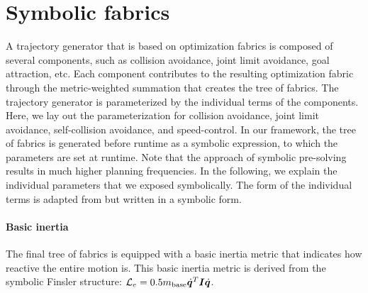 \section{Symbolic fabrics}
\label{sec:symbolic_fabrics}
%
A trajectory generator that is based on optimization fabrics is composed of several components, such as collision
avoidance, joint limit avoidance, goal attraction, etc. Each component contributes
to the resulting optimization fabric through the metric-weighted summation that creates the tree of fabrics.
The trajectory generator is parameterized by the individual terms of the components.
Here, we lay out the parameterization for collision
avoidance, joint limit avoidance, self-collision avoidance, and speed-control.
In our framework, the tree of
fabrics is generated before runtime as a symbolic expression, to which the parameters are set at runtime.
Note that the approach of symbolic pre-solving results in much higher planning frequencies.
In the following, we explain the individual parameters that we exposed symbolically. The form of the 
individual terms is adapted from \cite{Ratliff2020,Xie2021,Wyk2022} but written in a symbolic form.

\paragraph{Basic inertia}
The final tree of fabrics is equipped with a basic inertia metric that indicates how reactive the entire 
motion is. This basic inertia metric is derived from the symbolic Finsler structure:
$\mathcal{L}_e = 0.5m_{\textrm{base}}\dot{\bm{q}}^{T}\bm{I}\dot{\bm{q}}$.

